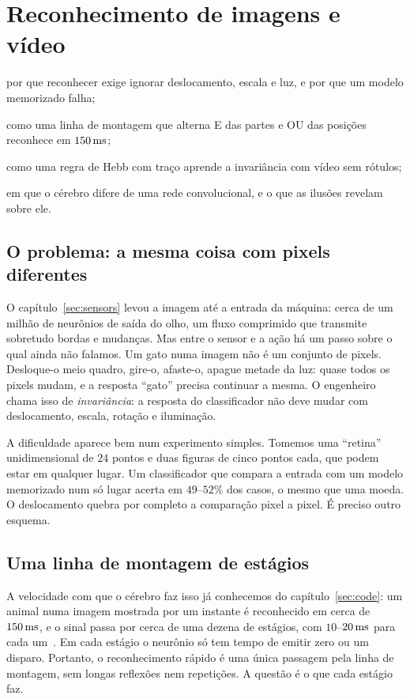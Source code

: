 \chapter{Reconhecimento de imagens e vídeo}
\label{sec:recognition}
\begin{chaptergoals}
\item por que reconhecer exige ignorar deslocamento, escala e luz, e por que um modelo memorizado falha;
\item como uma linha de montagem que alterna E das partes e OU das posições reconhece em $150\,\text{ms}$;
\item como uma regra de Hebb com traço aprende a invariância com vídeo sem rótulos;
\item em que o cérebro difere de uma rede convolucional, e o que as ilusões revelam sobre ele.
\end{chaptergoals}

\section{O problema: a mesma coisa com pixels diferentes}

O capítulo~\ref{sec:sensors} levou a imagem até a entrada da máquina: cerca de um milhão de neurônios de saída do olho, um fluxo comprimido que transmite sobretudo bordas e mudanças. Mas entre o sensor e a ação há um passo sobre o qual ainda não falamos. Um gato numa imagem não é um conjunto de pixels. Desloque-o meio quadro, gire-o, afaste-o, apague metade da luz: quase todos os pixels mudam, e a resposta ``gato'' precisa continuar a mesma. O engenheiro chama isso de \emph{invariância}: a resposta do classificador não deve mudar com deslocamento, escala, rotação e iluminação.

A dificuldade aparece bem num experimento simples. Tomemos uma ``retina'' unidimensional de $24$ pontos e duas figuras de cinco pontos cada, que podem estar em qualquer lugar. Um classificador que compara a entrada com um modelo memorizado num só lugar acerta em $49$--$52\%$ dos casos, o mesmo que uma moeda. O deslocamento quebra por completo a comparação pixel a pixel. É preciso outro esquema.

\section{Uma linha de montagem de estágios}

A velocidade com que o cérebro faz isso já conhecemos do capítulo~\ref{sec:code}: um animal numa imagem mostrada por um instante é reconhecido em cerca de $150\,\text{ms}$, e o sinal passa por cerca de uma dezena de estágios, com $10$--$20\,\text{ms}$ para cada um~\cite{Thorpe1996}. Em cada estágio o neurônio só tem tempo de emitir zero ou um disparo. Portanto, o reconhecimento rápido é uma única passagem pela linha de montagem, sem longas reflexões nem repetições. A questão é o que cada estágio faz.


